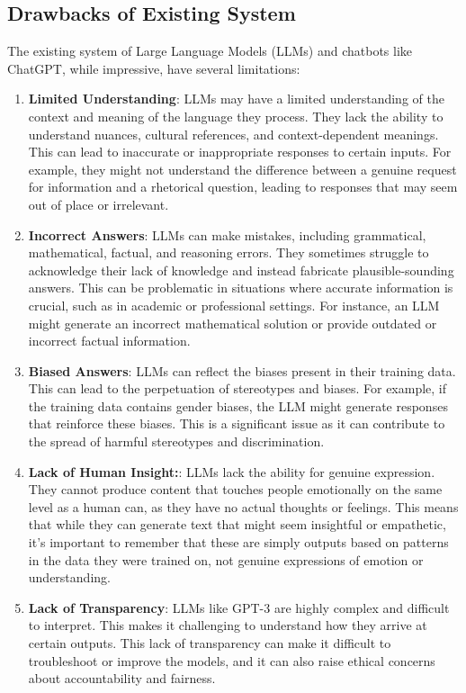 \subsection{Drawbacks of Existing System}
The existing system of Large Language Models (LLMs) and chatbots like ChatGPT, while impressive, have several limitations:
\begin{enumerate}
  \item \textbf{Limited Understanding}: LLMs may have a limited understanding of the context and meaning of the language they process. They lack the ability to understand nuances, cultural references, and context-dependent meanings. This can lead to inaccurate or inappropriate responses to certain inputs. For example, they might not understand the difference between a genuine request for information and a rhetorical question, leading to responses that may seem out of place or irrelevant.
  \item \textbf{Incorrect Answers}: LLMs can make mistakes, including grammatical, mathematical, factual, and reasoning errors. They sometimes struggle to acknowledge their lack of knowledge and instead fabricate plausible-sounding answers. This can be problematic in situations where accurate information is crucial, such as in academic or professional settings. For instance, an LLM might generate an incorrect mathematical solution or provide outdated or incorrect factual information.
  \item \textbf{Biased Answers}: LLMs can reflect the biases present in their training data. This can lead to the perpetuation of stereotypes and biases. For example, if the training data contains gender biases, the LLM might generate responses that reinforce these biases. This is a significant issue as it can contribute to the spread of harmful stereotypes and discrimination.
  \item \textbf{Lack of Human Insight:}: LLMs lack the ability for genuine expression. They cannot produce content that touches people emotionally on the same level as a human can, as they have no actual thoughts or feelings. This means that while they can generate text that might seem insightful or empathetic, it's important to remember that these are simply outputs based on patterns in the data they were trained on, not genuine expressions of emotion or understanding.
  \item \textbf{Lack of Transparency}: LLMs like GPT-3 are highly complex and difficult to interpret. This makes it challenging to understand how they arrive at certain outputs. This lack of transparency can make it difficult to troubleshoot or improve the models, and it can also raise ethical concerns about accountability and fairness.

\end{enumerate}
